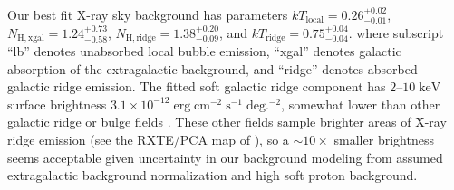 \documentclass[twocolumn,tighten,trackchanges]{aastex61}
\newcommand*{\mt}{\mathrm}
\newcommand*{\unit}[1]{\;\mt{#1}}  %
\newcommand*{\abt}{\mathord{\sim}} %
\newcommand*{\kB}{k}  %
\begin{document}
Our best fit X-ray sky background has parameters
$\kB T_{\mt{local}} = {0.26}^{+0.02}_{-0.01}$,
$N_{\mathrm{H,xgal}} = {1.24}^{+0.73}_{-0.58}$,
$N_{\mathrm{H,ridge}} = {1.38}^{+0.20}_{-0.09}$, and
$\kB T_{\mt{ridge}} = {0.75}^{+0.04}_{-0.04}$.
where subscript ``lb'' denotes unabsorbed local bubble emission,
``xgal'' denotes galactic absorption of the extragalactic background,
and ``ridge'' denotes absorbed galactic ridge emission.
The fitted soft galactic ridge component has $2$--$10 \unit{keV}$ surface
brightness $3.1 \times 10^{-12} \unit{erg\;cm^{-2}\;s^{-1}\;deg.^{-2}}$,
somewhat lower than other galactic ridge or bulge fields
\citep{ebisawa2008, revnivtsev2009}.
These other fields sample brighter areas of X-ray ridge emission (see the
RXTE/PCA map of \citet{revnivtsev2006}), so a $\abt 10\times$ smaller
brightness seems acceptable given uncertainty in our background modeling from
assumed extragalactic background normalization and high soft proton background.
\end{document}
